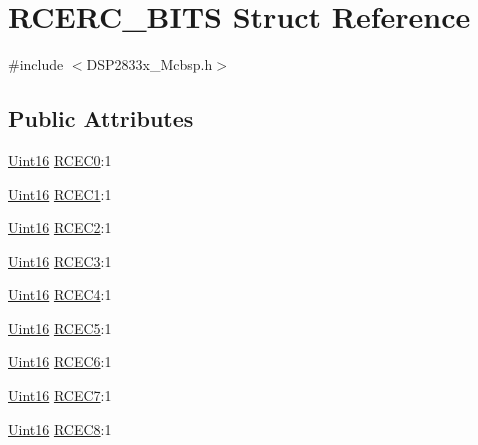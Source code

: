 \hypertarget{struct_r_c_e_r_c___b_i_t_s}{}\section{R\+C\+E\+R\+C\+\_\+\+B\+I\+T\+S Struct Reference}
\label{struct_r_c_e_r_c___b_i_t_s}


{\ttfamily \#include $<$D\+S\+P2833x\+\_\+\+Mcbsp.\+h$>$}

\subsection*{Public Attributes}
\begin{DoxyCompactItemize}
\item 
\hyperlink{_d_s_p2833x___device_8h_a59a9f6be4562c327cbfb4f7e8e18f08b}{Uint16} \hyperlink{struct_r_c_e_r_c___b_i_t_s_a403ca82b7da1aacee605d4cb2db1c553}{R\+C\+E\+C0}\+:1
\item 
\hyperlink{_d_s_p2833x___device_8h_a59a9f6be4562c327cbfb4f7e8e18f08b}{Uint16} \hyperlink{struct_r_c_e_r_c___b_i_t_s_a7d9cf7799562e3679a1d418e60b62343}{R\+C\+E\+C1}\+:1
\item 
\hyperlink{_d_s_p2833x___device_8h_a59a9f6be4562c327cbfb4f7e8e18f08b}{Uint16} \hyperlink{struct_r_c_e_r_c___b_i_t_s_acb7d03e0b6fa42f7cbed580afb89c2e4}{R\+C\+E\+C2}\+:1
\item 
\hyperlink{_d_s_p2833x___device_8h_a59a9f6be4562c327cbfb4f7e8e18f08b}{Uint16} \hyperlink{struct_r_c_e_r_c___b_i_t_s_abc07d4367d19c644ce701f7e1e2d69d2}{R\+C\+E\+C3}\+:1
\item 
\hyperlink{_d_s_p2833x___device_8h_a59a9f6be4562c327cbfb4f7e8e18f08b}{Uint16} \hyperlink{struct_r_c_e_r_c___b_i_t_s_a756fd989ef0900aa320ca50e64ae8d6b}{R\+C\+E\+C4}\+:1
\item 
\hyperlink{_d_s_p2833x___device_8h_a59a9f6be4562c327cbfb4f7e8e18f08b}{Uint16} \hyperlink{struct_r_c_e_r_c___b_i_t_s_a8396e44893bf44deb85740451c8a4f1a}{R\+C\+E\+C5}\+:1
\item 
\hyperlink{_d_s_p2833x___device_8h_a59a9f6be4562c327cbfb4f7e8e18f08b}{Uint16} \hyperlink{struct_r_c_e_r_c___b_i_t_s_a795315927bdcd68980deb8558ea1a323}{R\+C\+E\+C6}\+:1
\item 
\hyperlink{_d_s_p2833x___device_8h_a59a9f6be4562c327cbfb4f7e8e18f08b}{Uint16} \hyperlink{struct_r_c_e_r_c___b_i_t_s_a636045190e851ed6173e8397e135c193}{R\+C\+E\+C7}\+:1
\item 
\hyperlink{_d_s_p2833x___device_8h_a59a9f6be4562c327cbfb4f7e8e18f08b}{Uint16} \hyperlink{struct_r_c_e_r_c___b_i_t_s_aa83398c1987b19cbad995401d0c119a8}{R\+C\+E\+C8}\+:1

\end{DoxyCompactItemize}
